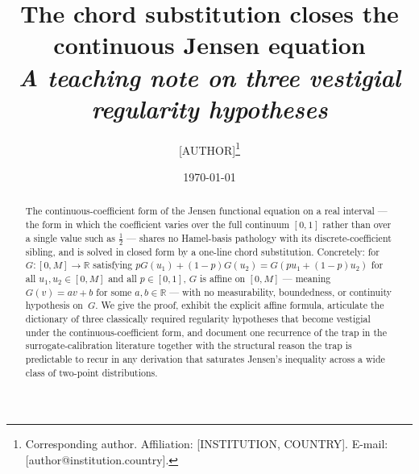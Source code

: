 \documentclass[11pt,a4paper]{amsart}
\newcommand{\R}{\mathbb R}
\begin{document}
\title[The chord substitution closes the continuous Jensen equation]%
{The chord substitution closes the continuous Jensen equation\\
\normalsize\textit{A teaching note on three vestigial regularity hypotheses}}

\author{[AUTHOR]\thanks{Corresponding author. Affiliation:
[INSTITUTION, COUNTRY]. E-mail: [author@institution.country].}}

\date{\today}


\begin{abstract}
The continuous-coefficient form of the Jensen functional equation on a
real interval --- the form in which the coefficient varies over the full
continuum $[0,1]$ rather than over a single value such as $\tfrac12$
--- shares no Hamel-basis pathology with its discrete-coefficient sibling,
and is solved in closed form by a one-line chord substitution. Concretely:
for $G\colon [0,M]\to\R$ satisfying $pG(u_1)+(1-p)G(u_2)=G(pu_1+(1-p)u_2)$
for all $u_1,u_2\in[0,M]$ and all $p\in[0,1]$, $G$ is affine on $[0,M]$
--- meaning $G(v)=av+b$ for some $a,b\in\R$ --- with no measurability,
boundedness, or continuity hypothesis on~$G$. We give the proof, exhibit
the explicit affine formula, articulate the dictionary of three classically
required regularity hypotheses that become vestigial under the
continuous-coefficient form, and document one recurrence of the trap in the
surrogate-calibration literature together with the structural reason the
trap is predictable to recur in any derivation that saturates Jensen's
inequality across a wide class of two-point distributions.
\end{abstract}
\end{document}
